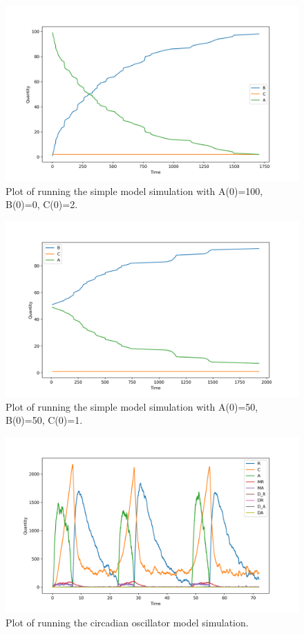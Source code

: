 \begin{figure}[H]
	\centering
	\includegraphics[width=\textwidth]{../plots/simple2}
	\caption{Plot of running the simple model simulation with A(0)=100, B(0)=0, C(0)=2.}
	\label{fig:plot_simple2}
\end{figure}

\begin{figure}[H]
	\centering
	\includegraphics[width=\textwidth]{../plots/simple3}
	\caption{Plot of running the simple model simulation with A(0)=50, B(0)=50, C(0)=1.}
	\label{fig:plot_simple3}
\end{figure}

\begin{figure}[H]
	\centering
	\includegraphics[width=\textwidth]{../plots/circadianOscillator.png}
	\caption{Plot of running the circadian oscillator model simulation.}
	\label{fig:plot_circadianOscillator}
\end{figure}

